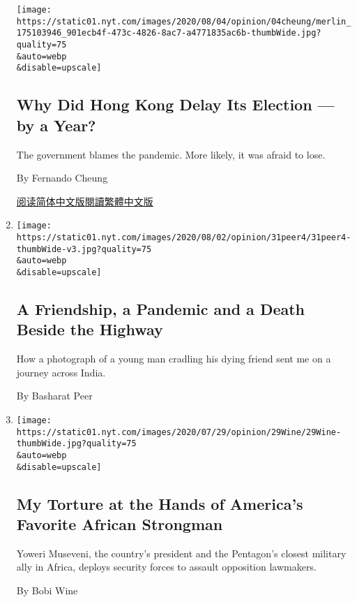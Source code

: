 \begin{enumerate}
  \texttt{[image: https://static01.nyt.com/images/2020/08/04/opinion/04cheung/merlin\_175103946\_901ecb4f-473c-4826-8ac7-a4771835ac6b-thumbWide.jpg?quality=75\\\&auto=webp\\\&disable=upscale]}

  \hypertarget{why-did-hong-kong-delay-its-election--by-a-year}{%
  \subsection{Why Did Hong Kong Delay Its Election --- by a
  Year?}\label{why-did-hong-kong-delay-its-election--by-a-year}}

  The government blames the pandemic. More likely, it was afraid to
  lose.

  By Fernando Cheung

  \href{https://cn.nytimes.com/opinion/20200803/hong-kong-election-china/}{阅读简体中文版}\href{https://cn.nytimes.com/opinion/20200803/hong-kong-election-china/zh-hant/}{閱讀繁體中文版}
\item
  \href{/2020/07/31/opinion/sunday/India-migration-coronavirus.html}{}

  \texttt{[image: https://static01.nyt.com/images/2020/08/02/opinion/31peer4/31peer4-thumbWide-v3.jpg?quality=75\\\&auto=webp\\\&disable=upscale]}

  \hypertarget{a-friendship-a-pandemic-and-a-death-beside-the-highway}{%
  \subsection{A Friendship, a Pandemic and a Death Beside the
  Highway}\label{a-friendship-a-pandemic-and-a-death-beside-the-highway}}

  How a photograph of a young man cradling his dying friend sent me on a
  journey across India.

  By Basharat Peer
\item
  \href{/2020/07/29/opinion/uganda-museveni-repression.html}{}

  \texttt{[image: https://static01.nyt.com/images/2020/07/29/opinion/29Wine/29Wine-thumbWide.jpg?quality=75\\\&auto=webp\\\&disable=upscale]}

  \hypertarget{my-torture-at-the-hands-of-americas-favorite-african-strongman}{%
  \subsection{My Torture at the Hands of America's Favorite African
  Strongman}\label{my-torture-at-the-hands-of-americas-favorite-african-strongman}}

  Yoweri Museveni, the country's president and the Pentagon's closest
  military ally in Africa, deploys security forces to assault opposition
  lawmakers.

  By Bobi Wine
\end{enumerate}

